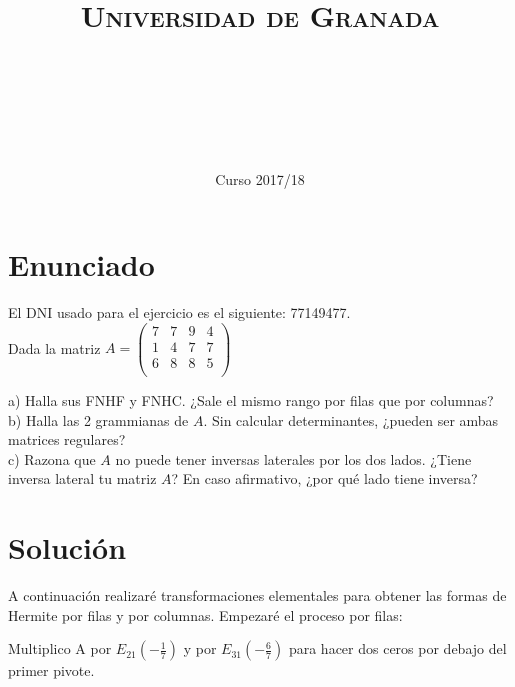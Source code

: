 \documentclass[11pt, a4paper]{article}
\title{
  \normalfont \normalsize 
  \textsc{Universidad de Granada} \\ [25pt]    %
  \horrule{0.5pt} \\[0.4cm] %
  \huge \sffamily\subject\\ %
  \horrule{2pt} \\[0.5cm] %
}
\author{\Large\sffamily{\docauthor}}
\date{\vspace{-1.5em} \normalsize \sffamily Curso 2017/18}
\newif\IfInSansMode
\theoremstyle{theorem-style}
\theoremstyle{definition-style}
\theoremstyle{remark-style}
\theoremstyle{example-style}
\begin{document}
\maketitle  %
\vfill
\begin{center}
\end{center}
\newpage
\tableofcontents    %
\newpage



\section{Enunciado}
El DNI usado para el ejercicio es el siguiente: 77149477. \\

Dada la matriz $A = 
	\begin{pmatrix}
	7 & 7 & 9 & 4 \\
	1 & 4 & 7 & 7 \\
	6 & 8 & 8 & 5 \\
	\end{pmatrix}$
	
a) Halla sus FNHF y FNHC. ¿Sale el mismo rango por filas que por columnas? \\
b) Halla las 2 grammianas de $A$. Sin calcular determinantes, ¿pueden ser ambas matrices regulares? \\
c) Razona que $A$ no puede tener inversas laterales por los dos lados. ¿Tiene inversa lateral tu matriz $A$? En caso afirmativo, ¿por qué lado tiene inversa?

\section{Solución}

A continuación realizaré transformaciones elementales para obtener las formas de Hermite por filas y por columnas. Empezaré el proceso por filas:

Multiplico A por $E_{21}(-\frac{1}{7})$ y por $E_{31}(-\frac{6}{7})$ para hacer dos ceros por debajo del primer pivote.
\end{document}
